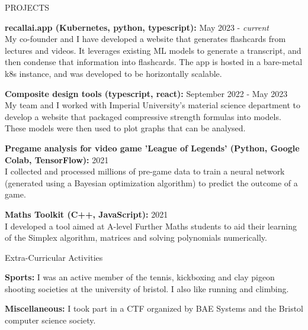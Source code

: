\documentclass{resume} %
\begin{document}
\begin{rSection}{PROJECTS}
\vspace{-1.25em}

\item \textbf{recallai.app (Kubernetes, python, typescript):} \hfill May 2023 - \textit{current} \\
{My co-founder and I have developed a website that generates flashcards from lectures and videos. It leverages existing ML models to generate a transcript, and then condense that information into flashcards. The app is hosted in a bare-metal k8s instance, and was developed to be horizontally scalable.}

\item \textbf{Composite design tools (typescript, react):} \hfill September 2022 - May 2023 \\
{My team and I worked with Imperial University's material science department to develop a website that packaged compressive strength formulas into models. These models were then used to plot graphs that can be analysed.}

\item \textbf{Pregame analysis for video game 'League of Legends' (Python, Google Colab, TensorFlow):} \hfill 2021 \\
{I collected and processed millions of pre-game data to train a neural network (generated using a Bayesian optimization algorithm) to predict the outcome of a game.}%

\item \textbf{Maths Toolkit (C++, JavaScript):} \hfill 2021 \\
{I developed a tool aimed at A-level Further Maths students to aid their learning of the Simplex algorithm, matrices and solving polynomials numerically.}

\end{rSection}

\begin{rSection}{Extra-Curricular Activities} 
\vspace{-1.25em}

\item{\textbf{Sports:}}
I was an active member of the tennis, kickboxing and clay pigeon shooting societies at the university of bristol. I also like running and climbing. \\

\vspace{-1.25em}

\item{\textbf{Miscellaneous:}}
I took part in a CTF organized by BAE Systems and the Bristol computer science society. \\

\end{rSection}
\end{document}
